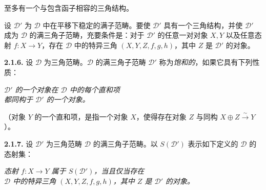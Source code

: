 \clearpage
{}%
\begingroup
\small
\setlength{\emergencystretch}{1.5em}%
\setlength{\abovedisplayskip}{2pt plus 1pt minus 1pt}%
\setlength{\belowdisplayskip}{2pt plus 1pt minus 1pt}%

\noindent 至多有一个与包含函子相容的三角结构。

设 $\mathcal D'$ 为 $\mathcal D$ 中在平移下稳定的满子范畴。要使
$\mathcal D'$ 具有一个三角结构，并使 $\mathcal D'$ 成为 $\mathcal D$
的满三角子范畴，充要条件是：对于
$\mathcal D'$ 的任意一对对象 $X,Y$ 以及任意态射
$f\colon X\to Y$，存在 $\mathcal D$ 中的特异三角 $(X,Y,Z,f,g,h)$，其中
$Z$ 是 $\mathcal D'$ 的对象。

\medskip
\noindent\textbf{2.1.6.}\quad
{}
设 $\mathcal D$ 为三角范畴。$\mathcal D$ 的满三角子范畴 $\mathcal D'$
称为\emph{饱和的}，如果它具有下列性质：

\par\smallskip
\noindent{}%
\begin{minipage}[t]{\linewidth}
  \centering\itshape
  $\mathcal D'$ 的一个对象在 $\mathcal D$ 中的每个直和项\\[-1pt]
  都同构于 $\mathcal D'$ 的一个对象。
\end{minipage}
\par\smallskip

\noindent （对象 $Y$ 的一个直和项，是指一个对象 $X$，使得存在对象 $Z$
与同构 $X\oplus Z\xrightarrow{\sim}Y$）。

\medskip
\noindent\textbf{2.1.7.}\quad
{}
设 $\mathcal D'$ 为三角范畴 $\mathcal D$ 的满三角子范畴。以
$S(\mathcal D')$ 表示如下定义的 $\mathcal D$ 的态射集：

\par\smallskip
\noindent{}%
\begin{minipage}[t]{\linewidth}
  \centering\itshape
  态射 $f\colon X\to Y$ 属于 $S(\mathcal D')$，当且仅当存在\\[-1pt]
  $\mathcal D$ 中的特异三角 $(X,Y,Z,f,g,h)$，其中 $Z$ 是 $\mathcal D'$ 的对象。
\end{minipage}
\par\smallskip

